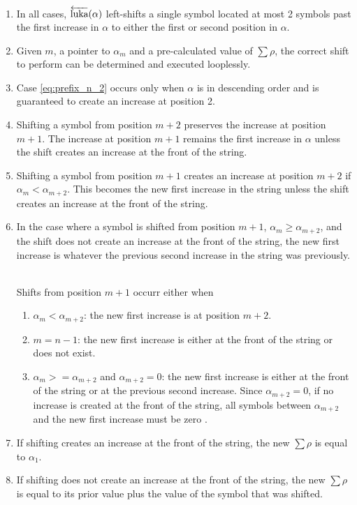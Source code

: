 \begin{enumerate}
    \item In all cases, $\overleftarrow{\text{luka}}(\alpha)$ left-shifts a single symbol located at most 2 symbols past the first increase in $\alpha$ to either the first or second position in $\alpha$.  
    \item Given $m$, a pointer to $\alpha_m$ and a pre-calculated value of $\sum{\rho}$, the correct shift to perform can be determined and executed looplessly.
    \item Case \eqref{eq:prefix_n_2} occurs only when $\alpha$ is in descending order and is guaranteed to create an increase at position 2.

    \item Shifting a symbol from position $m+2$ preserves the increase at position $m+1$.  The increase at position $m+1$ remains the first increase in $\alpha$ unless the shift creates an increase at the front of the string.

    \item Shifting a symbol from position $m+1$ creates an increase at position $m+2$ if $\alpha_m < \alpha_{m+2}$.  This becomes the new first increase in the string unless the shift creates an increase at the front of the string.

    \item In the case where a symbol is shifted from position $m+1$, $\alpha_m \ge \alpha_{m+2}$, and the shift does not create an increase at the front of the string, the new first increase is whatever the previous second increase in the string was previously. \

Shifts from position $m+1$ occurr either when 
        \begin{enumerate}
            \item $\alpha_m < \alpha_{m+2}$: the new first increase is at position $m+2$.
            \item $m=n-1$: the new first increase is either at the front of the string or does not exist.
	    \item $\alpha_m >= \alpha_{m+2}$ and $\alpha_{m+2} = 0$: the new first increase is either at the front of the string or at the previous second increase.  Since $\alpha_{m+2}=0$, if no increase is created at the front of the string, all symbols between $\alpha_{m+2}$ and the new first increase must be zero \label{reasonforstack}.
        \end{enumerate}
    \item If shifting creates an increase at the front of the string, the new $\sum{\rho}$ is equal to $\alpha_1$.
    \item If shifting does not create an increase at the front of the string, the new $\sum{\rho}$ is equal to its prior value plus the value of the symbol that was shifted.
         
\end{enumerate}

